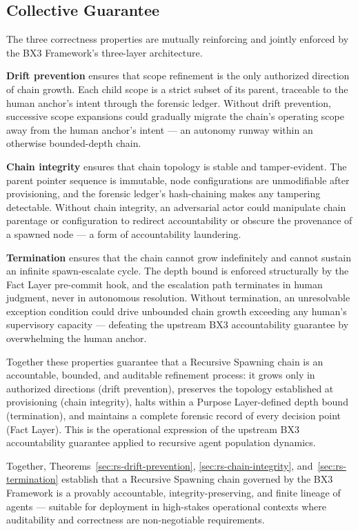 \subsection{Collective Guarantee}
\label{sec:rs-collective-guarantee}

The three correctness properties are mutually reinforcing and jointly enforced by the BX3 Framework's three-layer architecture.

\medskip
\textbf{Drift prevention} ensures that scope refinement is the only authorized direction of chain growth. Each child scope is a strict subset of its parent, traceable to the human anchor's intent through the forensic ledger. Without drift prevention, successive scope expansions could gradually migrate the chain's operating scope away from the human anchor's intent — an autonomy runway within an otherwise bounded-depth chain.

\medskip
\textbf{Chain integrity} ensures that chain topology is stable and tamper-evident. The parent pointer sequence is immutable, node configurations are unmodifiable after provisioning, and the forensic ledger's hash-chaining makes any tampering detectable. Without chain integrity, an adversarial actor could manipulate chain parentage or configuration to redirect accountability or obscure the provenance of a spawned node — a form of accountability laundering.

\medskip
\textbf{Termination} ensures that the chain cannot grow indefinitely and cannot sustain an infinite spawn-escalate cycle. The depth bound is enforced structurally by the Fact Layer pre-commit hook, and the escalation path terminates in human judgment, never in autonomous resolution. Without termination, an unresolvable exception condition could drive unbounded chain growth exceeding any human's supervisory capacity — defeating the upstream BX3 accountability guarantee by overwhelming the human anchor.

Together these properties guarantee that a Recursive Spawning chain is an accountable, bounded, and auditable refinement process: it grows only in authorized directions (drift prevention), preserves the topology established at provisioning (chain integrity), halts within a Purpose Layer-defined depth bound (termination), and maintains a complete forensic record of every decision point (Fact Layer). This is the operational expression of the upstream BX3 accountability guarantee applied to recursive agent population dynamics.

Together, Theorems~\ref{sec:rs-drift-prevention}, \ref{sec:rs-chain-integrity}, and~\ref{sec:rs-termination} establish that a Recursive Spawning chain governed by the BX3 Framework is a provably accountable, integrity-preserving, and finite lineage of agents — suitable for deployment in high-stakes operational contexts where auditability and correctness are non-negotiable requirements.